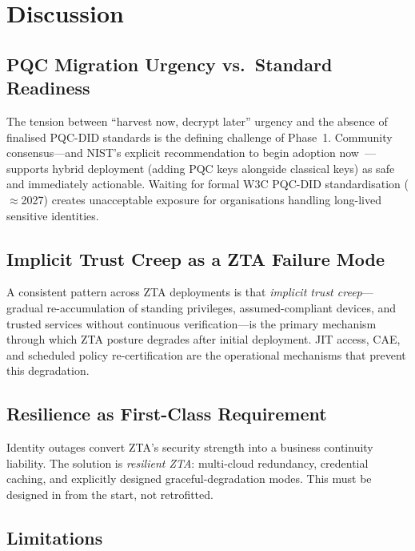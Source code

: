 \documentclass[sigconf,nonacm]{acmart}
\begin{document}
\section{Discussion}

\subsection{PQC Migration Urgency vs.\ Standard Readiness}

The tension between ``harvest now, decrypt later'' urgency and the
absence of finalised PQC-DID standards is the defining challenge of
Phase~1.  Community consensus---and NIST's explicit recommendation to
begin adoption now~\cite{nist204}---supports hybrid deployment (adding
PQC keys alongside classical keys) as safe and immediately actionable.
Waiting for formal W3C PQC-DID standardisation ($\approx$2027) creates
unacceptable exposure for organisations handling long-lived sensitive
identities.

\subsection{Implicit Trust Creep as a ZTA Failure Mode}

A consistent pattern across ZTA deployments is that
\emph{implicit trust creep}---gradual re-accumulation of standing
privileges, assumed-compliant devices, and trusted services without
continuous verification---is the primary mechanism through which ZTA
posture degrades after initial deployment.  JIT access, CAE, and
scheduled policy re-certification are the operational mechanisms that
prevent this degradation.

\subsection{Resilience as First-Class Requirement}

Identity outages convert ZTA's security strength into a
business con\-ti\-nu\-ity liability.  The solution is \emph{resilient ZTA}:
multi-cloud redundancy, credential caching, and explicitly designed
graceful-degradation modes.  This must be designed in from the start,
not retrofitted.

\subsection{Limitations}
\end{document}
